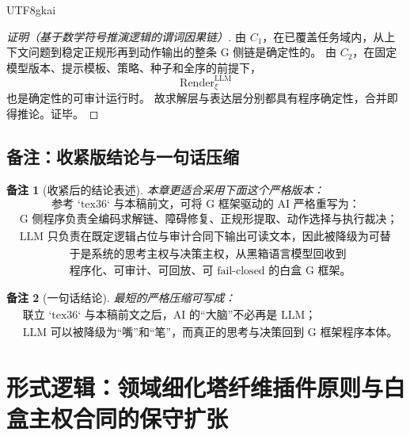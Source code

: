 \documentclass[12pt]{article}
\newtheorem{remark}{备注}[section]
\newcommand{\Render}{\operatorname{Render}}
\begin{document}
\begin{CJK*}{UTF8}{gkai}
\begin{proof}[证明（基于数学符号推演逻辑的谓词因果链）]
由 $C_1$，在已覆盖任务域内，从上下文问题到稳定正规形再到动作输出的整条 G 侧链是确定性的。
由 $C_2$，在固定模型版本、提示模板、策略、种子和全序的前提下，
\[
  \Render^{\mathrm{LLM}}_\xi
\]
也是确定性的可审计运行时。
故求解层与表达层分别都具有程序确定性，合并即得推论。证毕。
\end{proof}

\subsection{备注：收紧版结论与一句话压缩}
\label{subsec:tex37-ch6-remarks}

\begin{remark}[收紧后的结论表述]
本章更适合采用下面这个严格版本：
\[
  \boxed{
    \text{参考 `tex36` 与本稿前文，可将 G 框架驱动的 AI 严格重写为：}
  }
\]
\[
  \boxed{
    \begin{aligned}
      &\text{G 侧程序负责全编码求解链、障碍修复、正规形提取、动作选择与执行裁决；}\\
      &\text{LLM 只负责在既定逻辑占位与审计合同下输出可读文本，因此被降级为可替换插件。}
    \end{aligned}
  }
\]
\[
  \boxed{
    \begin{aligned}
      &\text{于是系统的思考主权与决策主权，从黑箱语言模型回收到}\\
      &\text{程序化、可审计、可回放、可 fail-closed 的白盒 G 框架。}
    \end{aligned}
  }
\]
\end{remark}

\begin{remark}[一句话结论]
最短的严格压缩可写成：
\[
  \boxed{
    \begin{aligned}
      &\text{联立 `tex36` 与本稿前文之后，AI 的“大脑”不必再是 LLM；}\\
      &\text{LLM 可以被降级为“嘴”和“笔”，而真正的思考与决策回到 G 框架程序本体。}
    \end{aligned}
  }
\]
\end{remark}

\clearpage

\section{形式逻辑：领域细化塔纤维插件原则与白盒主权合同的保守扩张}
\label{sec:tex37-ch7}


\end{CJK*}
\end{document}
